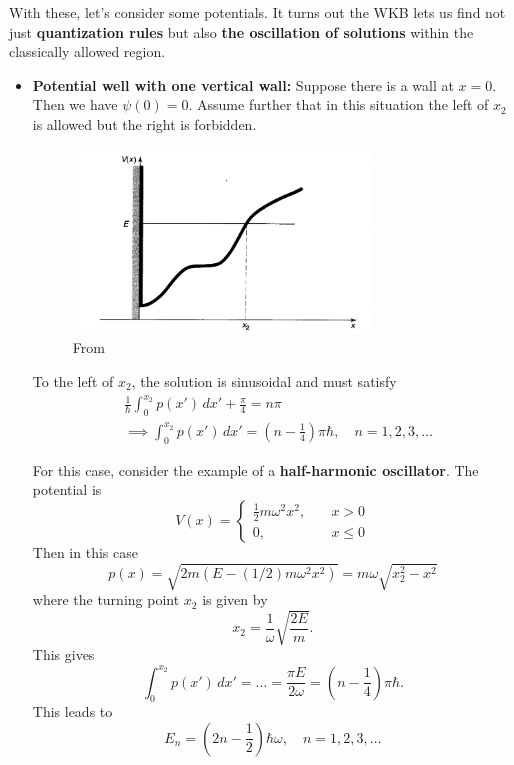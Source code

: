 \documentclass{book}
\theoremstyle{definition}
\newcommand{\f}[2]{\frac{#1}{#2}}
\newcommand{\lp}{\left(}
\newcommand{\rp}{\right)}
\begin{document}
With these, let's consider some potentials. It turns out the WKB lets us find not just \textbf{quantization rules} but also \textbf{the oscillation of solutions} within the classically allowed region.
\begin{itemize}
	\item \textbf{Potential well with one vertical wall:} Suppose there is a wall at $x=0$. Then we have $\psi(0) = 0$. Assume further that in this situation the left of $x_2$ is allowed but the right is forbidden. 
	
	\begin{figure}[!htb]
		\centering
		\includegraphics[width=0.75\textwidth]{images/wkb_4}
		\caption{From \cite{griffiths2018introduction}}
	\end{figure}

	To the left of $x_2$, the solution is sinusoidal and must satisfy 
	\begin{align*}
	&\f{1}{\hbar} \int_0^{x_2} p(x')\,dx' + \f{\pi}{4} = n\pi\\
	 &\implies \boxed{\int_0^{x_2} p(x')\,dx' = \lp n - \f{1}{4} \rp\pi \hbar, \quad n = 1,2,3,\dots}
	\end{align*}
	
	
	For this case, consider the example of a \textbf{half-harmonic oscillator}. The potential is 
	\begin{equation*}
	V(x) = \begin{cases}
	\f{1}{2}m\omega^2 x^2, &\quad x > 0\\
	0, &\quad x \leq 0
	\end{cases}
	\end{equation*}
	Then in this case
	\begin{equation*}
	p(x) = \sqrt{2m(E - (1/2) m\omega^2 x^2 )} = m\omega \sqrt{x_2^2 -x^2}
	\end{equation*}
	where the turning point $x_2$ is given by 
	\begin{equation*}
	x_2 = \f{1}{\omega}\sqrt{\f{2E}{m}}.
	\end{equation*}
	This gives
	\begin{equation*}
	\int_0^{x_2}p(x')\,dx' = \dots = \f{\pi E}{2\omega} = \lp n - \f{1}{4} \rp \pi\hbar.
	\end{equation*}
	This leads to
	\begin{equation*}
	E_n = \lp 2n - \f{1}{2}   \rp \hbar \omega, \quad n = 1,2,3,\dots
	\end{equation*}
	

\end{itemize}
\end{document}
